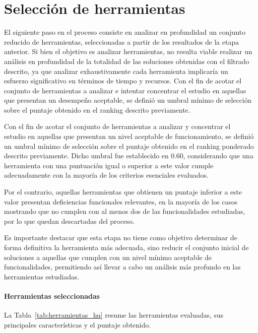 \section{Selección de herramientas}
El siguiente paso en el proceso consiste en analizar en profundidad un conjunto reducido de herramientas, seleccionadas a partir de los resultados de la etapa anterior. Si bien el objetivo es analizar herramientas, no resulta viable realizar un análisis en profundidad de la totalidad de las soluciones obtenidas con el filtrado descrito, ya que analizar exhaustivamente cada herramienta implicaría un esfuerzo significativo en términos de tiempo y recursos.
Con el fin de acotar el conjunto de herramientas a analizar e intentar concentrar el estudio en aquellas que presentan un desempeño aceptable, se definió un umbral mínimo de selección sobre el puntaje obtenido en el ranking descrito previamente.

Con el fin de acotar el conjunto de herramientas a analizar y concentrar el estudio en aquellas que presentan un nivel aceptable de funcionamiento, se definió un umbral mínimo de selección sobre el puntaje obtenido en el ranking ponderado descrito previamente. Dicho umbral fue establecido en 0.60, considerando que una herramienta con una puntuación igual o superior a este valor cumple adecuadamente con la mayoría de los criterios esenciales evaluados.

Por el contrario, aquellas herramientas que obtienen un puntaje inferior a este valor presentan deficiencias funcionales relevantes, en la mayoría de los casos mostrando que no cumplen con al menos dos de las funcionalidades estudiadas, por lo que quedan descartadas del proceso.

Es importante destacar que esta etapa no tiene como objetivo determinar de forma definitiva la herramienta más adecuada, sino reducir el conjunto inicial de soluciones a aquellas que cumplen con un nivel mínimo aceptable de funcionalidades, permitiendo así llevar a cabo un análisis más profundo en las herramientas estudiadas.

\paragraph{Herramientas seleccionadas}
La Tabla~\ref{tab:herramientas_hu} resume las herramientas evaluadas, sus principales características y el puntaje obtenido.

